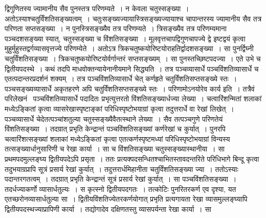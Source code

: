 \documentclass[11pt, openany]{book}
\begin{document}
\noindent द्विगुणितस्य ज्यामानीय सैव पुनस्तत्र परिणम्यते~। न केवला चतुस्सङ्ख्या~। अतोऽस्याश्चतुर्विंशतिसङ्ख्यत्वम्~। चतुःसङ्ख्यज्यायास्त्रिसङ्ख्यज्यायाश्च चापान्तरस्य ज्यामानीय सैव तत्र परिणता सप्तसङ्ख्या~। न पुनस्त्रिसङ्ख्यैव तत्र परिणम्यते~। त्रिसङ्ख्यैव तत्र परिणम्यमाना पञ्चदशसङ्ख्या स्यात्, चतुस्सङ्ख्या च विंशतिसङ्ख्या~। मूलवृत्तचापद्विगुणचापज्ये द्वे
इष्टद्वयं कृत्वा मुहुर्मुहुस्तद्वर्गव्यासवृत्तज्ये परिणम्येते~। अतोऽत्र त्रिकचतुष्कयोरिष्टयोराहतिर्द्वादशसङ्ख्या~। सा पुनर्द्विघ्नी चतुर्विंशतिसङ्ख्या~।
त्रिकचतुष्कयोरिष्टयोर्वर्गान्तरं सप्तसङ्ख्यम्~। सा पुनस्तच्छिष्टपदज्या~। एते उभे च द्वितीयपदस्थे~। कथं तदपि माधवोक्तन्यायेनानीयमाने सिद्ध्यति~। तत्र पञ्चव्यासार्धे पञ्चविंशतिव्यासार्धे च एतत्पदान्तरप्रदर्शनं शक्यम्~। तत्र पञ्चविंशतिव्यासार्धे चेत् कर्णहृते चतुर्विंशतिसप्तसङ्ख्ये स्तः~।
पञ्चसङ्ख्यव्यासार्धे अकृतहरणे अपि चतुर्विंशतिसप्तसङ्ख्ये स्तः~। परिणामोऽनयोरेव कार्य इति~। तत्रैवं परिलेखनं \textendash\ पञ्चविंशतिव्यासार्धे पदादितः प्रभृत्युत्तरतो विंशतिसङ्ख्यार्धज्या लेख्या~। चत्वारिंशन्मितां शलाकां मध्येऽङ्कितां कृत्वा व्यासरेखास्पृष्टाङ्कां परिधिस्पृष्टोभयाग्रां कृत्वा तदुत्तरार्धे वा रेखां लिखेत्~। पञ्चव्यासार्धे चेदेतत्पञ्चांशतुल्या चतुस्सङ्ख्यैवैतत्स्थाने लेख्या~। सैव तत्पञ्चगुणे परिणतेयं विंशतिसङ्ख्या~। तदग्रात् प्रभृति केन्द्रान्तं पञ्चविंशतिसङ्ख्यां कर्णरेखां च कुर्यात्~। पुनरपि चत्वारिंशत्सङ्ख्यां शलाकां मध्येऽङ्कितां कृत्वा एतत्कर्णस्पृष्टमध्यां परिधिस्पृष्टोभयाग्रां विन्यस्य तत्सङ्ख्यार्धानुसारिणी च रेखा कार्या~। सा च विंशतिसङ्ख्या चतुस्सङ्ख्यास्थानीया~। सा प्रथमपदमुल्लङ्घ्य द्वितीयपदेऽपि प्रसृता~। ततः प्रत्यक्पदसन्धितश्चाभितस्तावदन्तरिते परिधिभागे बिन्दू कृत्वा तदुभयाग्रप्रापि सूत्रं प्रसार्य रेखां
कुर्यात्~। तदुत्तरार्धमिहानीता चतुर्विंशतिसङ्ख्या ज्या~। ततोऽस्याः पदान्तरगतत्वम्~। तदग्रात् प्रभृति केन्द्रान्तं सूत्रं प्रसार्य रेखां कुर्यात्~। सा
पञ्चविंशतिसङ्ख्या~। तदर्धज्याकर्णो व्यासार्धतुल्यः~। स कृत्स्नो द्वितीयपदगतः~। तत्कोटिः पुनरितरकर्ण एव दृश्या, यत एतच्छरोनव्यासार्धतुल्या सा~। द्वितीयविंशतिज्येतरकर्णयोगात् प्रभृति प्रत्यगायता रेखा व्यासमुल्लङ्घ्यापि द्वितीयपदस्थज्याप्रापिणी कार्या~। तद्योगादेव दक्षिणतस्तु व्यासपर्यन्ता रेखा कार्या~। सा

\newpage
\end{document}

